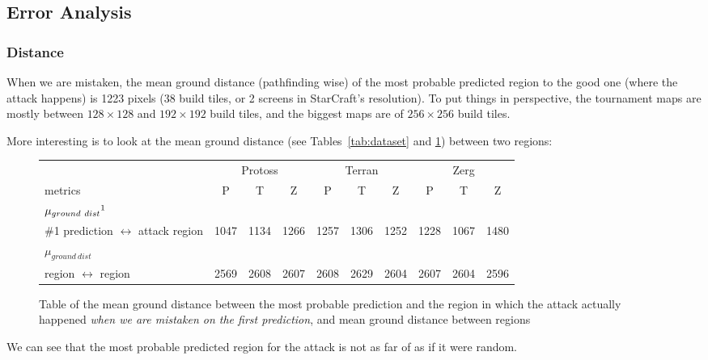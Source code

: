 \subsection{Error Analysis}

\subsubsection{Distance}

When we are mistaken, the mean ground distance (pathfinding wise) of the most probable predicted region to the good one (where the attack happens) is 1223 pixels (38 build tiles, or 2 screens in StarCraft's resolution). 
To put things in perspective, %
the tournament maps are mostly between $128\times128$ and $192\times192$ build tiles, and the biggest maps are of $256\times 256$ build tiles.

More interesting is to look at the mean ground distance (see Tables~\ref{tab:dataset} and \ref{tab:shorttacticaldistances}) between two regions: 
\begin{figure}[h]
\begin{tabular}{|l|ccc|ccc|ccc|}
\hline
 & \multicolumn{3}{|c|}{Protoss} & \multicolumn{3}{|c|}{Terran} & \multicolumn{3}{|c|}{Zerg} \\
metrics & P & T & Z & P & T & Z & P & T & Z \\
\hline
$\mu_{ground\ dist}\footnote{for regions connected by ground, pathfinding aware, in pixels}$ & & & & & & & & & \\
\#1 prediction $\leftrightarrow$ attack region & 1047 & 1134 & 1266 & 1257 & 1306 & 1252 & 1228 & 1067 & 1480 \\
\hline
$\mu_{ground\ dist}$ & & & & & & & & &\\
 region $\leftrightarrow$ region & 2569 & 2608 & 2607 & 2608 & 2629 & 2604 & 2607 & 2604 & 2596 \\ %
\hline
\end{tabular}
\caption{Table of the mean ground distance between the most probable prediction and the region in which the attack actually happened \textit{when we are mistaken on the first prediction}, and mean ground distance between regions}
\label{tab:shorttacticaldistances}
\end{figure}
We can see that the most probable predicted region for the attack is not as far of as if it were random.

